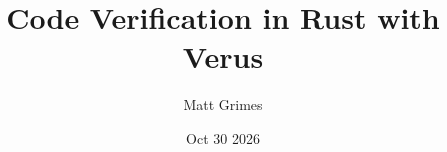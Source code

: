 \documentclass[aspectratio=169,11pt]{beamer}
\title{Code Verification in Rust with Verus}
\author{Matt Grimes}
\date{Oct 30 2026}
\begin{document}
\begin{frame}[plain]
\vspace{9mm}\titlepage
\end{frame}






\end{document}
